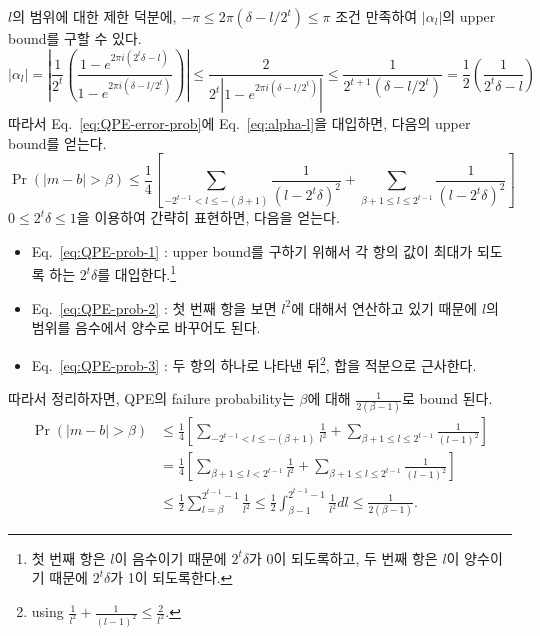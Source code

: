 $l$의 범위에 대한 제한 덕분에, $-\pi \le 2\pi(\delta - l/2^t) \le \pi$ 조건 만족하여 $|\alpha_l|$의 upper bound를 구할 수 있다.
\begin{equation}
  \left|\alpha_l\right|=\left|\frac{1}{2^t}\left(\frac{1-e^{2 \pi i\left(2^t \delta-l\right)}}{1-e^{2 \pi i\left(\delta-l / 2^t\right)}}\right)\right| \leq \frac{2}{2^t | 1-e^{2 \pi i\left(\delta-l / 2^t\right)}|} \leq \frac{1}{2^{t+1}\left(\delta-l / 2^t\right)}  = \frac{1}{2} \left( \frac{1}{2^t \delta - l} \right) \label{eq:alpha-l}
\end{equation}
따라서 Eq.~\eqref{eq:QPE-error-prob}에 Eq.~\eqref{eq:alpha-l}을 대입하면, 다음의 upper bound를 얻는다.
\begin{equation}
\Pr(|m-b|>\beta) \leq \frac{1}{4}\left[\sum_{-2^{t-1}<l \leq-(\beta+1)} \frac{1}{\left(l-2^t \delta\right)^2}+\sum_{\beta+1 \leq l \leq 2^{t-1}} \frac{1}{\left(l-2^t \delta\right)^2}\right] 
\end{equation}
$0\le 2^t \delta \le 1$을 이용하여 간략히 표현하면, 다음을 얻는다.
\begin{itemize}
  \item Eq.~\eqref{eq:QPE-prob-1} : upper bound를 구하기 위해서 각 항의 값이 최대가 되도록 하는 $2^t \delta$를 대입한다.\footnote{첫 번째 항은 $l$이 음수이기 때문에 $2^t \delta$가 0이 되도록하고, 두 번째 항은 $l$이 양수이기 때문에 $2^t \delta$가 1이 되도록한다.}
  \item Eq.~\eqref{eq:QPE-prob-2} : 첫 번째 항을 보면 $l^2$에 대해서 연산하고 있기 때문에 $l$의 범위를 음수에서 양수로 바꾸어도 된다.
  \item Eq.~\eqref{eq:QPE-prob-3} : 두 항의 하나로 나타낸 뒤\footnote{using $ \frac{1}{l^2} + \frac{1}{(l-1)^2} \leq \frac{2}{l^2}. $}, 합을 적분으로 근사한다.
\end{itemize}
따라서 정리하자면, QPE의 failure probability는 $\beta$에 대해 $\frac{1}{2(\beta-1)}$로 bound 된다.
\begin{align}
  \Pr(|m-b|>\beta) & \leq \frac{1}{4}\left[\sum_{-2^{t-1}<l \leq-(\beta+1)} \frac{1}{l^2}+\sum_{\beta+1 \leq l \leq 2^{t-1}} \frac{1}{(l-1)^2}\right] \label{eq:QPE-prob-1}\\ 
  & =\frac{1}{4}\left[\sum_{\beta+1 \leq l<2^{t-1}} \frac{1}{l^2}+\sum_{\beta+1 \leq l \leq 2^{t-1}} \frac{1}{(l-1)^2}\right] \label{eq:QPE-prob-2}\\
  & \leq \frac{1}{2} \sum_{l=\beta}^{2^{t-1}-1} \frac{1}{l^2} \leq \frac{1}{2} \int_{\beta-1}^{2^{t-1}-1} \frac{1}{l^2}  dl \leq \frac{1}{2(\beta-1)} .\label{eq:QPE-prob-3}
\end{align}

